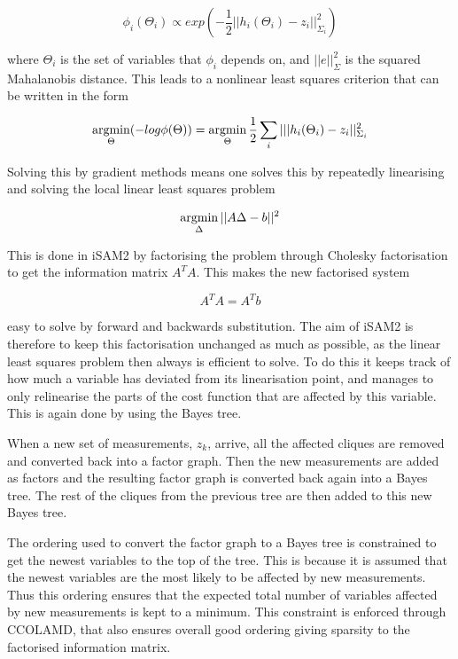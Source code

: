 \begin{equation}
    \phi_i(\Theta_i) \propto exp(-\frac{1}{2}||h_i(\Theta_i) - z_i||_{\Sigma_i}^2)
\end{equation}

where $\Theta_i$ is the set of variables that $\phi_i$ depends on, and $||e||_{\Sigma}^2$ is the squared Mahalanobis distance\cite{Mahalanobis}. This leads to a nonlinear least squares criterion that can be written in the form 

\begin{equation}
    \operatorname*{argmin}_{\Theta}(-log\phi(\Theta)) = \operatorname*{argmin}_{\Theta}\frac{1}{2}\sum_i|||h_i(\Theta_i) - z_i||_{\Sigma_i}^2
\end{equation}

Solving this by gradient methods means one solves this by repeatedly linearising and solving the local linear least squares problem

\begin{equation}
    \operatorname*{argmin}_{\Delta}||A\Delta - b||^2
\end{equation}

This is done in iSAM2 by factorising the problem through Cholesky factorisation to get the information matrix $A^TA$. This makes the new factorised system

\begin{equation}
    A^TA = A^Tb
\end{equation}

easy to solve by forward and backwards substitution. The aim of iSAM2 is therefore to keep this factorisation unchanged as much as possible, as the linear least squares problem then always is efficient to solve. To do this it keeps track of how much a variable has deviated from its linearisation point, and manages to only relinearise the parts of the cost function that are affected by this variable. This is again done by using the Bayes tree. 

When a new set of measurements, $z_k$, arrive,  all the affected cliques are removed and converted back into a factor graph. Then the new measurements are added as factors and the resulting factor graph is converted back again into a Bayes tree. The rest of the cliques from the previous tree are then added to this new Bayes tree. 

The ordering used to convert the factor graph to a Bayes tree is constrained to get the newest variables to the top of the tree. This is because it is assumed that the newest variables are the most likely to be affected by new measurements. Thus this ordering ensures that the expected total number of variables affected by new measurements is kept to a minimum. This constraint is enforced through CCOLAMD\cite{CCOLAMD}, that also ensures overall good ordering giving sparsity to the factorised information matrix. 

